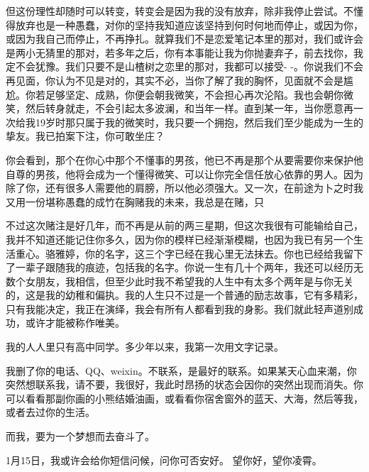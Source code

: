 \documentclass{article}
\begin{document}
\newpage 

但这份理性却随时可以转变，转变会是因为我的没有放弃，除非我停止尝试。不懂得放弃也是一种愚蠢，对你的坚持我知道应该坚持到何时何地而停止，或因为你，或因为我自己而停止，不再挣扎。就算我们不是恋爱笔记本里的那对，我们或许会是两小无猜里的那对，若多年之后，你有本事能让我为你抛妻弃子，前去找你，我定不会犹豫。我们只要不是山楂树之恋里的那对，我都可以接受- -。你说我们不会再见面，你认为不见是对的，其实不必，当你了解了我的胸怀，见面就不会是尴尬。你若足够坚定、成熟，你便会朝我微笑，不会担心再次沦陷。我也会朝你微笑，然后转身就走，不会引起太多波澜，和当年一样。直到某一年，当你愿意再一次给我19岁时那只属于我的微笑时，我只要一个拥抱，然后我们至少能成为一生的挚友。我已拍案下注，你可敢坐庄？

你会看到，那个在你心中那个不懂事的男孩，他已不再是那个从要需要你来保护他自尊的男孩，他将会成为一个懂得微笑、可以让你完全信任放心依靠的男人。因为除了你，还有很多人需要他的肩膀，所以他必须强大。又一次，在前途为卜之时我又用一份堪称愚蠢的成竹在胸赌我的未来，我总是在赌，只

\newpage 

不过这次赌注是好几年，而不再是从前的两三星期，但这次我很有可能输给自己，我并不知道还能记住你多久，因为你的模样已经渐渐模糊，也因为我已有另一个生活重心。骆雅婷，你的名字，这三个字已经在我心里无法抹去。你也已经给我留下了一辈子跟随我的痕迹，包括我的名字。你说一生有几十个两年，我还可以经历无数个女朋友，我相信，但至少此时我不希望我的人生中有太多个两年是与你无关的，这是我的幼稚和偏执。我的人生只不过是一个普通的励志故事，它有多精彩，只有我能决定，我正在演绎，我会有所有人都看到我的身影。我们就此轻声道别成功，或许才能被称作唯美。

我的人人里只有高中同学。多少年以来，我第一次用文字记录。

我删了你的电话、QQ、weixin。不联系，是最好的联系。如果某天心血来潮，你突然想联系我，请不要，我很好，我此时昂扬的状态会因你的突然出现而消失。你可以看看那副你画的小熊结婚油画，或看看你宿舍窗外的蓝天、大海，然后等我，或者去过你的生活。

而我，要为一个梦想而去奋斗了。

\newpage 



1月15日，我或许会给你短信问候，问你可否安好。
望你好，望你凌霄。
\end{document}

